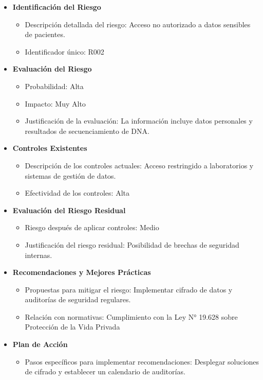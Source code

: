 \begin{itemize}
  \item \textbf{Identificación del Riesgo}
    \begin{itemize}
      \item Descripción detallada del riesgo: Acceso no autorizado a datos sensibles de pacientes.
      \item Identificador único: R002
    \end{itemize}
  \item \textbf{Evaluación del Riesgo}
    \begin{itemize}
      \item Probabilidad: Alta
      \item Impacto: Muy Alto
      \item Justificación de la evaluación: La información incluye datos personales y resultados de secuenciamiento de DNA.
    \end{itemize}
  \item \textbf{Controles Existentes}
    \begin{itemize}
      \item Descripción de los controles actuales: Acceso restringido a laboratorios y sistemas de gestión de datos.
      \item Efectividad de los controles: Alta
    \end{itemize}
  \item \textbf{Evaluación del Riesgo Residual}
    \begin{itemize}
      \item Riesgo después de aplicar controles: Medio
      \item Justificación del riesgo residual: Posibilidad de brechas de seguridad internas.
    \end{itemize}
  \item \textbf{Recomendaciones y Mejores Prácticas}
    \begin{itemize}
      \item Propuestas para mitigar el riesgo: Implementar cifrado de datos y auditorías de seguridad regulares.
      \item Relación con normativas: Cumplimiento con la Ley N° 19.628 sobre Protección de la Vida Privada
    \end{itemize}
  \item \textbf{Plan de Acción}
    \begin{itemize}
      \item Pasos específicos para implementar recomendaciones: Desplegar soluciones de cifrado y establecer un calendario de auditorías.

\end{itemize}
\end{itemize}
